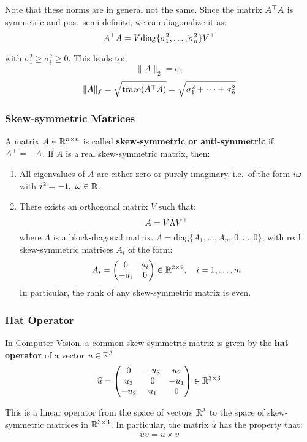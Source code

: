 \noindent
Note that these norms are in general not the same.
Since the matrix $A^{\top}A$ is symmetric and pos.\ semi-definite,
we can diagonalize it as:
\[A^{\top}A = V \text{diag}\{\sigma^2_1, \ldots, \sigma^2_n\}V^{\top}\]

\noindent
with $\sigma^2_1 \ge \sigma^2_i \ge 0$. This leads to:
	\[\|A\|_2 = \sigma_1\]
	\[\|A\|_f = \sqrt{\text{trace}(A^{\top}A)} = \sqrt{\sigma^2_1 + \cdots + \sigma^2_n}\]

\subsubsection{Skew-symmetric Matrices}
\label{ssub:skew_symmetric_matrices}

A matrix $A \in \mathbb{R}^{n \times n}$ is called
\textbf{skew-symmetric or anti-symmetric} if $A^{\top} = -A$.
If $A$ is a real skew-symmetric matrix, then:
\begin{enumerate}
	\item All eigenvalues of $A$ are either zero or purely imaginary,
		i.e.\ of the form $i\omega$ with $i ^2 = -1,\ \omega \in \mathbb{R}$.
	\item There exists an orthogonal matrix $V$ such that:
		\[A = V \Lambda V^{\top}\]
		where $\Lambda$ is a block-diagonal matrix.
		$\Lambda = \text{diag}\{A_1, \ldots, A_m, 0, \ldots, 0\}$,
		with real skew-symmetric matrices $A_i$ of the form:
		\[A_i = \begin{pmatrix}
				0 & a_i \\
				-a_i & 0
		\end{pmatrix}
		\in \mathbb{R}^{2 \times 2}, \quad i = 1, \ldots, m\]
		In particular, the rank of any skew-symmetric matrix is even.
\end{enumerate}


\subsubsection{Hat Operator}
\label{ssub:hat_operator}

In Computer Vision, a common skew-symmetric matrix is given by the
\textbf{hat operator} of a vector $u \in \mathbb{R}^{3}$
	\[\widehat{u} = \begin{pmatrix}
		0 & -u_3 & u_2 \\
		u_3 & 0 & -u_1 \\
		-u_2 & u_1 & 0
	\end{pmatrix} \in \mathbb{R}^{3 \times 3}\]

\noindent
This is a linear operator from the space of vectors $\mathbb{R}^3$
to the space of skew-symmetric matrices in $\mathbb{R}^{3 \times{} 3}$.
In particular, the matrix $\widehat{u}$ has the property that:
	\[\widehat{u}v = u \times v\]

